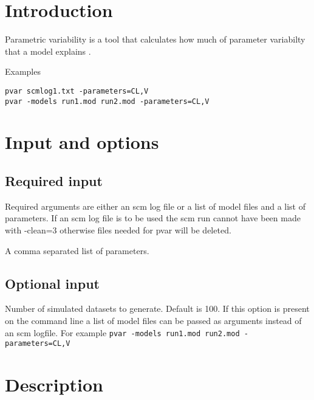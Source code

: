 



\maketitle


\section{Introduction}
Parametric variability is a tool that calculates how much of parameter variabilty that a model explains \cite{Hennig}.

Examples
\begin{verbatim}
pvar scmlog1.txt -parameters=CL,V
pvar -models run1.mod run2.mod -parameters=CL,V
\end{verbatim}

\section{Input and options}

\subsection{Required input}
Required arguments are either an scm log file or a list of model files and a list of parameters. If an scm log file is to be used the scm run cannot have been made with -clean=3 otherwise files needed for pvar will be deleted.

\begin{optionlist}

A comma separated list of parameters.
\nextopt
\end{optionlist}

\subsection{Optional input}

\begin{optionlist}
Number of simulated datasets to generate. Default is 100.
\nextopt
{}
If this option is present on the command line a list of model files can be passed as arguments instead of an scm logfile. For example \verb|pvar -models run1.mod run2.mod -parameters=CL,V|
\end{optionlist}

\section{Description}

